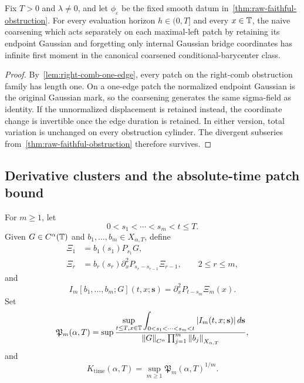 \begin{corollary}
\label{cor:bridge-coarsening-fails}
Fix $T>0$ and $\lambda\neq0$, and let $\phi_\varepsilon$ be the fixed smooth datum in~\cref{thm:raw-faithful-obstruction}. For every evaluation horizon $h\in(0,T]$ and every $x\in\mathbb T$, the naive coarsening which acts separately on each maximal-left patch by retaining its endpoint Gaussian and forgetting only internal Gaussian bridge coordinates has infinite first moment in the canonical coarsened conditional-barycenter class.
\end{corollary}

\begin{proof}
By~\cref{lem:right-comb-one-edge}, every patch on the right-comb obstruction family has length one. On a one-edge patch the normalized endpoint Gaussian is the original Gaussian mark, so the coarsening generates the same sigma-field as identity. If the unnormalized displacement is retained instead, the coordinate change is invertible once the edge duration is retained. In either version, total variation is unchanged on every obstruction cylinder. The divergent subseries from~\cref{thm:raw-faithful-obstruction} therefore survives.
\end{proof}

\subsection{Derivative clusters and the absolute-time patch bound}

For $m\geq1$, let
\begin{equation*}
  0<s_1<\cdots<s_m<t\leq T.
\end{equation*}
Given $G\in C^\alpha(\mathbb T)$ and $b_1,\ldots,b_m\in X_{\alpha,T}$, define
\begin{align*}
  \Xi_1&=b_1(s_1)P_{s_1}G,\\
  \Xi_r&=b_r(s_r)
  \partial_x^2P_{s_r-s_{r-1}}\Xi_{r-1},
  \qquad 2\leq r\leq m,
\end{align*}
and
\begin{equation}
  I_m[b_1,\ldots,b_m;G](t,x;\mathbf s)
  =
  \partial_x^2P_{t-s_m}\Xi_m(x).
  \label{eq:time-spine-integrand}
\end{equation}
Set
\begin{equation}
  \mathfrak P_m(\alpha,T)
  =
  \sup
  \frac{
    \displaystyle
    \sup_{t\leq T,x\in\mathbb T}
    \int_{0<s_1<\cdots<s_m<t}
    \left|I_m(t,x;\mathbf s)\right|d\mathbf s
  }{
    \left\lVert G\right\rVert_{C^\alpha}
    \prod_{j=1}^m\left\lVert b_j\right\rVert_{X_{\alpha,T}}
  },
  \label{eq:time-patch-constant}
\end{equation}
and
\begin{equation}
  K_{\mathrm{time}}(\alpha,T)
  =
  \sup_{m\geq1}
  \mathfrak P_m(\alpha,T)^{1/m}.
  \label{eq:K-time}
\end{equation}

